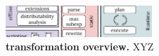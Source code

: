 \documentclass[sigplan,10pt,review,anonymous]{acmart}
\newcommand{\heading}[1]{\vspace{4pt}\noindent\textbf{#1}\enspace}
\newcommand{\ttt}[1]{\texttt{\small #1}}
\begin{document}


\begin{figure}[t]
\centering
\includegraphics[width=0.49\textwidth]{./figs/dish_overview.pdf}
\caption{
  \textbf{\sys transformation overview.}
	\sys XYZ
}
\label{fig:overview}
\end{figure}


\end{document}
